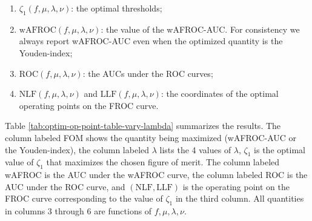 \documentclass[
]{book}
\begin{document}
\begin{enumerate}
\def\labelenumi{\arabic{enumi}.}
\item
  \(\zeta_{1} \left ( f, \mu, \lambda, \nu \right )\): the optimal thresholds;
\item
  \(\text{wAFROC} \left (f, \mu, \lambda, \nu \right )\): the value of the wAFROC-AUC. For consistency we always report wAFROC-AUC even when the optimized quantity is the Youden-index;
\item
  \(\text{ROC} \left (f, \mu, \lambda, \nu \right )\): the AUCs under the ROC curves;
\item
  \(\text{NLF} \left (f, \mu, \lambda, \nu \right )\) and \(\text{LLF} \left (f, \mu, \lambda, \nu \right )\): the coordinates of the optimal operating points on the FROC curve.
\end{enumerate}

Table \ref{tab:optim-op-point-table-vary-lambda} summarizes the results. The column labeled FOM shows the quantity being maximized (wAFROC-AUC or the Youden-index), the column labeled \(\lambda\) lists the 4 values of \(\lambda\), \(\zeta_1\) is the optimal value of \(\zeta_1\) that maximizes the chosen figure of merit. The column labeled wAFROC is the AUC under the wAFROC curve, the column labeled ROC is the AUC under the ROC curve, and \(\left( \text{NLF}, \text{LLF}\right)\) is the operating point on the FROC curve corresponding to the value of \(\zeta_1\) in the third column. All quantities in columns 3 through 6 are functions of \(f, \mu, \lambda, \nu\).

\begin{table}[H]

\caption{\label{tab:optim-op-point-table-vary-lambda}Summary of optimization results for $\mu = 2$, $\nu = 0.9$ and 4 values of $\lambda$. FOM = figure of merit.}
\centering
{}
\end{table}
\end{document}
